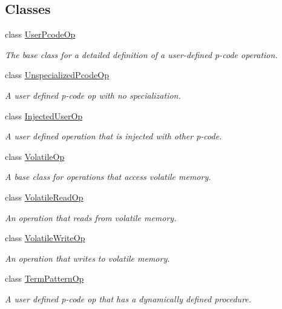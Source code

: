 \subsection*{Classes}
\begin{DoxyCompactItemize}
\item 
class \mbox{\hyperlink{class_user_pcode_op}{User\+Pcode\+Op}}
\begin{DoxyCompactList}\small\item\em The base class for a detailed definition of a user-\/defined p-\/code operation. \end{DoxyCompactList}\item 
class \mbox{\hyperlink{class_unspecialized_pcode_op}{Unspecialized\+Pcode\+Op}}
\begin{DoxyCompactList}\small\item\em A user defined p-\/code op with no specialization. \end{DoxyCompactList}\item 
class \mbox{\hyperlink{class_injected_user_op}{Injected\+User\+Op}}
\begin{DoxyCompactList}\small\item\em A user defined operation that is injected with other p-\/code. \end{DoxyCompactList}\item 
class \mbox{\hyperlink{class_volatile_op}{Volatile\+Op}}
\begin{DoxyCompactList}\small\item\em A base class for operations that access volatile memory. \end{DoxyCompactList}\item 
class \mbox{\hyperlink{class_volatile_read_op}{Volatile\+Read\+Op}}
\begin{DoxyCompactList}\small\item\em An operation that reads from volatile memory. \end{DoxyCompactList}\item 
class \mbox{\hyperlink{class_volatile_write_op}{Volatile\+Write\+Op}}
\begin{DoxyCompactList}\small\item\em An operation that writes to volatile memory. \end{DoxyCompactList}\item 
class \mbox{\hyperlink{class_term_pattern_op}{Term\+Pattern\+Op}}
\begin{DoxyCompactList}\small\item\em A user defined p-\/code op that has a dynamically defined procedure. \end{DoxyCompactList}\item 

\end{DoxyCompactItemize}
